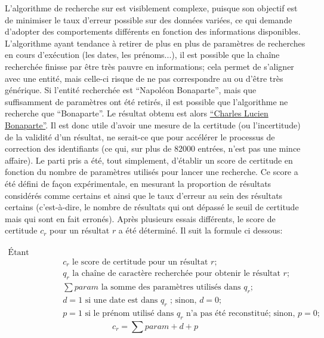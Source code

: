 L'algorithme de recherche sur \wkd{} est visiblement complexe, puisque son objectif est de minimiser le taux d'erreur possible sur des données variées, ce qui demande d'adopter des comportements différents en fonction des informations disponibles. L'algorithme ayant tendance à retirer de plus en plus de paramètres de recherches en cours d'exécution (les dates, les prénoms...), il est possible que la chaîne recherchée finisse par être très pauvre en informations; cela permet de s'aligner avec une entité, mais celle-ci risque de ne pas correspondre au \tname{} ou d'être très générique. Si l'entité recherchée est \enquote{Napoléon Bonaparte}, mais que suffisamment de paramètres ont été retirés, il est possible que l'algorithme ne recherche que \enquote{Bonaparte}. Le résultat obtenu est alors \href{https://www.wikidata.org/w/index.php?search=bonaparte&search=bonaparte&title=Special%3ASearch&go=Go&ns0=1&ns120=1}{\enquote{Charles Lucien Bonaparte}}. Il est donc utile d'avoir une mesure de la certitude (ou l'incertitude) de la validité d'un résultat, ne serait-ce que pour accélérer le processus de correction des identifiants (ce qui, sur plus de 82000 entrées, n'est pas une mince affaire). Le parti pris a été, tout simplement, d'établir un score de certitude en fonction du nombre de paramètres utilisés pour lancer une recherche. Ce score a été défini de façon expérimentale, en mesurant la proportion de résultats considérés comme certains et ainsi que le taux d'erreur au sein des résultats certains (c'est-à-dire, le nombre de résultats qui ont dépassé le seuil de certitude mais qui sont en fait erronés). Après plusieurs essais différents, le score de certitude \(c_r\) pour un résultat \(r\) a été déterminé. Il suit la formule ci dessous:

\begin{align*}
	\text{Étant donnés:} \\ 
	&c_r \text{ le score de certitude pour un résultat } r \text{;}\\
	&q_r \text{ la chaîne de caractère recherchée pour obtenir le résultat } r \text{;}\\
	&\sum param \text{ la somme des paramètres utilisés dans } q_r \text{;} \\
	&d = 1 \text{ si une date est dans } q_r \text{ ; sinon, } d = 0 \text{;} \\
	&p = 1 \text{ si le prénom utilisé dans } q_r \text{ n'a pas été reconstitué; sinon, } p = 0 \text{;}
\end{align*}
\begin{displaymath}
	c_r = \sum param + d + p
\end{displaymath}

